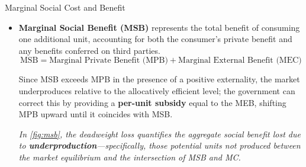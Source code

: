 \documentclass[10pt]{article}
\begin{document}
\begin{core}{Marginal Social Cost and Benefit}
\begin{itemize}
{\begin{axis}


          \draw[->, thick] (axis cs:6.5,7) -- (axis cs:5.5,8);
          \draw[->, thick] (axis cs:4.75,1.5) -- (axis cs:3.75,1.5);

          \node[circle, fill=black, inner sep=2pt] at (axis cs:3.5,6.5) {};

          \draw[dashed] (axis cs:5,5) -- (axis cs:5,0);
          \draw[dashed] (axis cs:3.5,6.5) -- (axis cs:3.5,0);

          \end{axis} 
        }{Marginal social cost in an allocatively inefficient market (\textit{left}) and corresponding government intervention (\textit{right}) via a per-unit tax}{fig:msc}{0.85}

        \item \textbf{Marginal Social Benefit (MSB)} represents the total benefit of consuming one additional unit, accounting for both the consumer's private benefit and any benefits conferred on third parties.
        \[
          \text{MSB} = \text{Marginal Private Benefit (MPB)} + \text{Marginal External Benefit (MEC)}
        \]

        Since MSB exceeds MPB in the presence of a positive externality, the market underproduces relative to the allocatively efficient level; the government can correct this by providing a \textbf{per-unit subsidy} equal to the MEB, shifting MPB upward until it coincides with MSB.

        \textit{In \autoref{fig:msb}, the deadweight loss quantifies the aggregate social benefit lost due to \textbf{underproduction}---specifically, those potential units not produced between the market equilibrium and the intersection of MSB and MC.}

\end{itemize}
\end{core}
\end{document}

